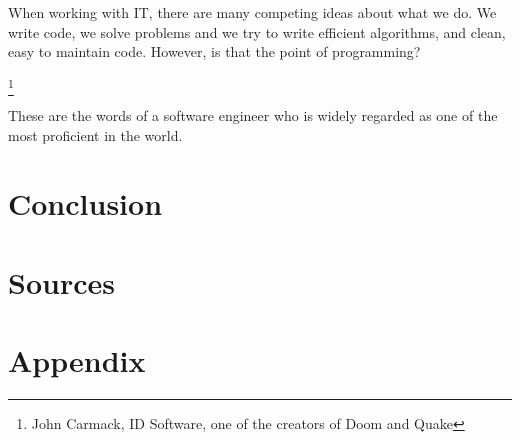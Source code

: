 \documentclass[../main.tex]{subfiles}
\begin{document}
When working with IT, there are many competing ideas about what we do. We write
code, we solve problems and we try to write efficient algorithms, and clean, easy to maintain code. However, is that the point of programming? 

\footnote{John Carmack, ID Software, one of the creators of Doom and Quake}

These are the words of a software engineer who is  widely regarded as one of the most proficient in the world.


\section{Conclusion}
\label{sec:conclusion}


\section{Sources}
\label{sec:sources}

\section{Appendix}
\label{sec:appendix}
\end{document}
